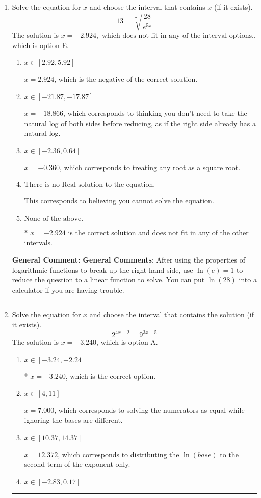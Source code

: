 \documentclass{extbook}[14pt]
\newcommand{\litem}[1]{\item #1

\rule{\textwidth}{0.4pt}}
\begin{document}
\begin{enumerate}\litem{
 Solve the equation for $x$ and choose the interval that contains $x$ (if it exists).
\[  13 = \sqrt[7]{\frac{28}{e^{5x}}} \]The solution is \( x = -2.924, \text{ which does not fit in any of the interval options.} \), which is option E.\begin{enumerate}[label=\Alph*.]
\item \( x \in [2.92, 5.92] \)

$x = 2.924$, which is the negative of the correct solution.
\item \( x \in [-21.87, -17.87] \)

$x = -18.866$, which corresponds to thinking you don't need to take the natural log of both sides before reducing, as if the right side already has a natural log.
\item \( x \in [-2.36, 0.64] \)

$x = -0.360$, which corresponds to treating any root as a square root.
\item \( \text{There is no Real solution to the equation.} \)

This corresponds to believing you cannot solve the equation.
\item \( \text{None of the above.} \)

* $x = -2.924$ is the correct solution and does not fit in any of the other intervals.
\end{enumerate}

\textbf{General Comment:} \textbf{General Comments}: After using the properties of logarithmic functions to break up the right-hand side, use $\ln(e) = 1$ to reduce the question to a linear function to solve. You can put $\ln(28)$ into a calculator if you are having trouble.
}
\litem{
Solve the equation for $x$ and choose the interval that contains the solution (if it exists).
\[ 2^{4x-2} = 9^{3x+5} \]The solution is \( x = -3.240 \), which is option A.\begin{enumerate}[label=\Alph*.]
\item \( x \in [-3.24, -2.24] \)

* $x = -3.240$, which is the correct option.
\item \( x \in [4, 11] \)

$x = 7.000$, which corresponds to solving the numerators as equal while ignoring the bases are different.
\item \( x \in [10.37, 14.37] \)

$x = 12.372$, which corresponds to distributing the $\ln(base)$ to the second term of the exponent only.
\item \( x \in [-2.83, 0.17] \)


\end{enumerate}}
\end{enumerate}
\end{document}
